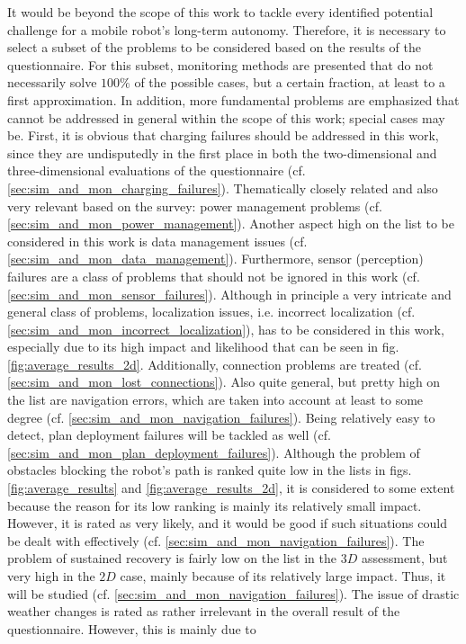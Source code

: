 \documentclass[english, master, utf8]{base/thesis_KBS}
\begin{document}
\noindent
It would be beyond the scope of this work to tackle every identified potential challenge for a mobile robot's long-term autonomy. Therefore, it is necessary to select a subset of the
problems to be considered based on the results of the questionnaire. For this subset, monitoring methods are presented that do not necessarily solve $100\%$ of the possible cases,
but a certain fraction, at least to a first approximation. In addition, more fundamental problems are emphasized that cannot be addressed in general within the scope of this work;
special cases may be. 
First, it is obvious that charging failures should be addressed in this work, since they are undisputedly in the first place in both the two-dimensional and three-dimensional
evaluations of the questionnaire (cf. \ref{sec:sim_and_mon_charging_failures}). Thematically closely related and also very relevant based on the survey:
power management problems (cf. \ref{sec:sim_and_mon_power_management}). Another aspect high on the list to be considered in this work is data management
issues (cf. \ref{sec:sim_and_mon_data_management}). Furthermore, sensor (perception) failures are a class of problems that should not be ignored in this work
(cf. \ref{sec:sim_and_mon_sensor_failures}). Although in principle a very intricate and general class of problems, localization issues, i.e. incorrect
localization (cf. \ref{sec:sim_and_mon_incorrect_localization}), has to be considered in this work, especially due to its high impact and likelihood
that can be seen in fig. \ref{fig:average_results_2d}. Additionally, connection problems are treated (cf. \ref{sec:sim_and_mon_lost_connections}). Also quite
general, but pretty high on the list are navigation errors, which are taken into account at least to some degree (cf. \ref{sec:sim_and_mon_navigation_failures}). Being relatively easy to detect, plan deployment failures will be tackled as well (cf. \ref{sec:sim_and_mon_plan_deployment_failures}). Although the problem of obstacles blocking the robot's path is ranked quite low in the lists in figs. \ref{fig:average_results} and
\ref{fig:average_results_2d}, it is considered to some extent because the reason for its low ranking is mainly its relatively small impact. However, it is rated as very likely,
and it would be good if such situations could be dealt with effectively (cf. \ref{sec:sim_and_mon_navigation_failures}). The problem of sustained recovery is fairly low on
the list in the $3D$ assessment, but very high in the $2D$ case, mainly because of its relatively large impact. Thus, it will be studied (cf. \ref{sec:sim_and_mon_navigation_failures}). The issue of drastic weather changes is rated as rather irrelevant in the overall result of the questionnaire. However, this is mainly due to
\end{document}
